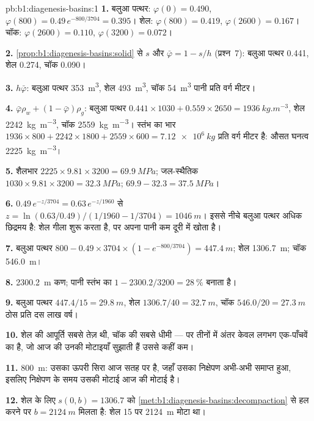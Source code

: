 \begin{solution}{pb:b1:diagenesis-basins:1}
\textbf{1.} बलुआ पत्थर: $\varphi(0) = \num{0.490}$, $\varphi(800) =
0.49\,e^{-800/3704} = \num{0.395}$। शेल: $\varphi(800) = \num{0.419}$,
$\varphi(2600) = \num{0.167}$। चॉक: $\varphi(2600) = \num{0.110}$,
$\varphi(3200) = \num{0.072}$।

\textbf{2.} \cref{prop:b1:diagenesis-basins:solid} से $s$ और $\bar\varphi
= 1 - s/h$ (प्रश्न~7): बलुआ पत्थर \num{0.441}, शेल \num{0.274}, चॉक \num{0.090}।

\textbf{3.} $h\bar\varphi$: बलुआ पत्थर \qty{353}{m^3}, शेल \qty{493}{m^3}, चॉक
\qty{54}{m^3} पानी प्रति वर्ग मीटर।

\textbf{4.} $\bar\varphi\rho_w + (1 - \bar\varphi)\rho_g$: बलुआ पत्थर
$0.441\times1030 + 0.559\times2650 = \qty{1936}{kg.m^{-3}}$, शेल
\qty{2242}{kg.m^{-3}}, चॉक \qty{2559}{kg.m^{-3}}। स्तंभ का भार
$1936\times800 + 2242\times1800 + 2559\times600 = \qty{7.12e6}{kg}$ प्रति वर्ग मीटर
है: औसत घनत्व \qty{2225}{kg.m^{-3}}।

\textbf{5.} शैलभार $2225\times9.81\times3200 = \qty{69.9}{MPa}$; जल-स्थैतिक
$1030\times9.81\times3200 = \qty{32.3}{MPa}$; 
$69.9 - 32.3 = \qty{37.5}{MPa}$।

\textbf{6.} $0.49\,e^{-z/3704} = 0.63\,e^{-z/1960}$ से $z = \ln(0.63/0.49)
/(1/1960 - 1/3704) = \qty{1046}{m}$। इससे नीचे बलुआ पत्थर अधिक छिद्रमय है: शेल गीला
शुरू करता है, पर अपना पानी कम दूरी में खोता है।

\textbf{7.} बलुआ पत्थर $800 - 0.49\times3704\times(1 - e^{-800/3704}) =
\qty{447.4}{m}$; शेल \qty{1306.7}{m}; चॉक \qty{546.0}{m}।

\textbf{8.} \qty{2300.2}{m} कण; पानी स्तंभ का $1 - 2300.2/3200 =
\qty{28}{\%}$ बनाता है।

\textbf{9.} बलुआ पत्थर $447.4/15 = \qty{29.8}{m}$, शेल $1306.7/40 =
\qty{32.7}{m}$, चॉक $546.0/20 = \qty{27.3}{m}$ ठोस प्रति दस लाख वर्ष।

\textbf{10.} शेल की आपूर्ति सबसे तेज़ थी, चॉक की सबसे धीमी --- पर तीनों में अंतर
केवल लगभग एक-पाँचवें का है, जो आज की उनकी मोटाइयाँ सुझाती हैं उससे कहीं कम।

\textbf{11.} \qty{800}{m}: उसका ऊपरी सिरा आज सतह पर है, जहाँ उसका निक्षेपण अभी-अभी
समाप्त हुआ, इसलिए निक्षेपण के समय उसकी मोटाई आज की मोटाई है।

\textbf{12.} शेल के लिए $s(0, b) = 1306.7$ को \cref{met:b1:diagenesis-basins:decompaction}
से हल करने पर $b = \qty{2124}{m}$ मिलता है: शेल \qty{15}{\Ma} पर \qty{2124}{m} मोटा था।


\end{solution}
